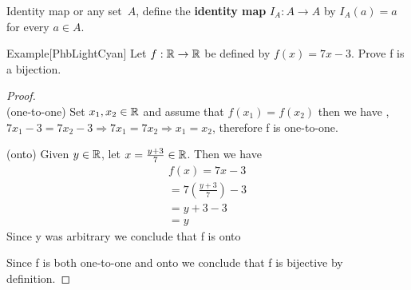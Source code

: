 \documentclass[../MATH-2000-Notes.tex]{subfiles}
\begin{document}
\begin{Definition}
    {Identity map}
    or any set~$A$, define the \textbf{identity map} $I_A \colon A \to A$ by $I_A(a) = a$ for every $a \in A$.
\end{Definition}
\begin{commentbox}{Example}[{PhbLightCyan}]
    Let \(f: \mathbb{R} \rightarrow \mathbb{R}\) be defined by \(f(x) = 7x - 3\). Prove f is a bijection.
\end{commentbox}
\begin{proof}~\\
    (one-to-one) Set \(x_1,x_2 \in \mathbb{R}\) and assume that \(f(x_1) = f(x_2)\) then we have , \(7x_1 - 3 = 7x_2 - 3 \Rightarrow 7x_1 = 7x_2 \Rightarrow x_1 = x_2\), therefore f is one-to-one.

    (onto) Given \(y \in \mathbb{R}\), let \(x = \frac{y + 3}{7} \in \mathbb{R}\). Then we have
    \begin{gather*}
        f(x) = 7x-3\\
        = 7 \left( \frac{y + 3}{7} \right)-3\\
        = y + 3 - 3\\
        = y
    \end{gather*}
    Since y was arbitrary we conclude that f is onto

    Since f is both one-to-one and onto we conclude that f is bijective by definition.
\end{proof}
\end{document}
